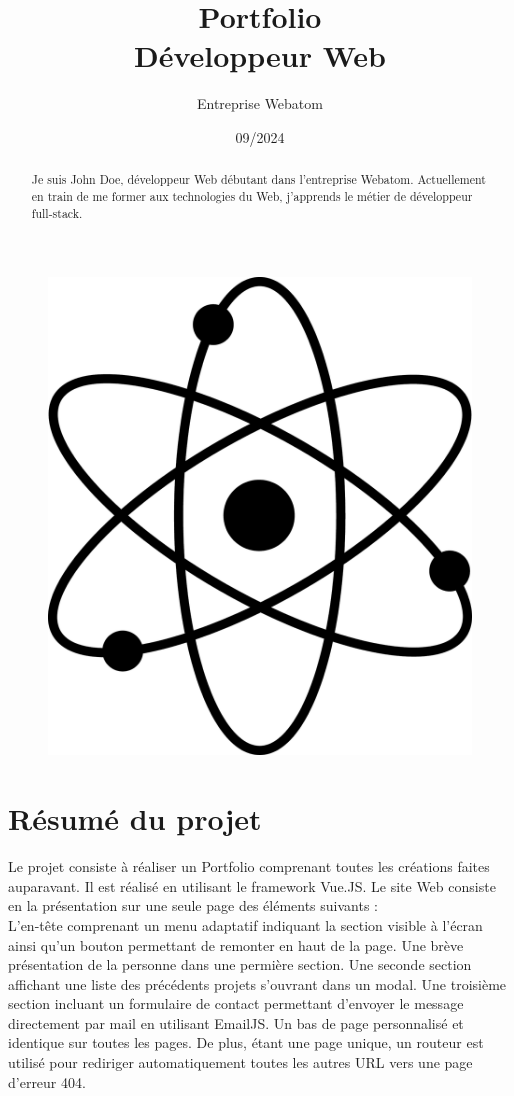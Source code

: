 \documentclass[a4paper, 12pt]{article}
\title{Portfolio\\
Développeur Web}
\author{Entreprise Webatom}
\date{09/2024}
\begin{document}
\renewcommand{\abstractname}{Présentation}
\maketitle
\begin{abstract}
    Je suis John Doe, développeur Web débutant dans l'entreprise Webatom. Actuellement en train de me former aux technologies du Web, j'apprends le métier de développeur full-stack.
\end{abstract}
\begin{figure}[H]
    \centering
    \includegraphics[scale=0.15]{./src/assets/atom.png}
\end{figure}
\clearpage
\tableofcontents
\newpage
\section{Résumé du projet}
Le projet consiste à réaliser un Portfolio comprenant toutes les créations faites auparavant. Il est réalisé en utilisant le framework Vue.JS. Le site Web consiste en la présentation sur une seule page des éléments suivants :\\
L'en-tête comprenant un menu adaptatif indiquant la section visible à l'écran ainsi qu'un bouton permettant de remonter en haut de la page. Une brève présentation de la personne dans une permière section. Une seconde section affichant une liste des précédents projets s'ouvrant dans un modal. Une troisième section incluant un formulaire de contact permettant d'envoyer le message directement par mail en utilisant EmailJS. Un bas de page personnalisé et identique sur toutes les pages. De plus, étant une page unique, un routeur est utilisé pour rediriger automatiquement toutes les autres URL vers une page d'erreur 404.
\end{document}
